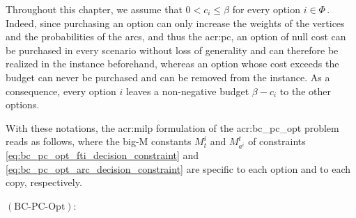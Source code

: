 \documentclass[11pt,a4paper]{report}
\makeatletter
\theoremstyle{definition}
\theoremstyle{remark}
\newcommand\xlabel[2][]{\phantomsection\def\@currentlabelname{#1}#1\label{#2}}
\newcounter{optimization_program}
\newcounter{optimization_program_st}
\newcommand{\name}[1]{\gdef\@name{#1}}%
\newcommand{\sense}[1]{\gdef\@sense{#1}}%
\newcommand{\objective}[1]{\gdef\@objective{#1}}%
\newcommand{\constraints}[1]{\gdef\@constraints{\setcounter{optimization_program_st}{1}#1\setcounter{optimization_program_st}{0}}}%
\newcommand{\constraint}[2]{\\ \ifnum\value{optimization_program_st}>0 {\textnormal{subject to~}} \else {}\fi & \text{~#1} && \text{~~~~#2} \setcounter{optimization_program_st}{0}}%
\makeatother
\begin{document}
Throughout this chapter, we assume that $0 < c_i \leq \beta$ for every option $i \in \Phi\,.$ Indeed, since purchasing an option can only increase the weights of the vertices and the probabilities of the arcs, and thus the \gls{acr:pc}, an option of null cost can be purchased in every scenario without loss of generality and can therefore be realized in the instance beforehand, whereas an option whose cost exceeds the budget can never be purchased and can be removed from the instance. As a consequence, every option $i$ leaves a non-negative budget $\beta - c_i$ to the other options.

With these notations, the \gls{acr:milp} formulation of the \gls{acr:bc_pc_opt} problem reads as follows, where the big-M constants $M^i_t$ and $M^t_{a^i}$ of constraints \eqref{eq:bc_pc_opt_fti_decision_constraint} and \eqref{eq:bc_pc_opt_arc_decision_constraint} are specific to each option and to each copy, respectively.

\vspace{0.75cm}
\xlabel[$(\text{BC-PC-Opt})$]{bc_pc_opt}:
\vspace*{-0.75cm}
\begin{optimization_program}
  \name{}
  \sense{maximize}
  \objective{$\sum\limits_{t \in V} \left(w_t \cdot f_t + \sum\limits_{i \in \Phi} w_t^i \cdot f_t^i\right)$}
  \constraints{
    \constraint{\label{eq:bc_pc_opt_flow_conservation}$\sum\limits_{a \in \delta^{\text{out}}_u} \phi^t_a - \sum\limits_{b \in \delta^{\text{in}}_u} \pi_b \cdot \phi^t_b \leq w_u + \sum\limits_{i \in \Phi} w_u^i \cdot x_i$} {$t \in V\,,$ $u \in V \setminus \{t\}$}
    \constraint{\label{eq:bc_pc_opt_flow_in_t}$\sum\limits_{a \in \delta^{\text{out}}_t} \phi^t_a - \sum\limits_{b \in \delta^{\text{in}}_t} \pi_b\cdot  \phi^t_b =  w_t + \sum\limits_{i \in \Phi} w_t^i \cdot x_i - f_t$} {$t\in V$}
    \constraint{\label{eq:bc_pc_opt_fti_ft}$f_t^i \le f_t$} {$t\in V\,,$ $i \in \Phi$}
    \constraint{\label{eq:bc_pc_opt_fti_decision_constraint}$f_t^i \le M^i_t \cdot x_i$} {$t\in V\,,$ $i \in \Phi$}
    \constraint{\label{eq:bc_pc_opt_arc_decision_constraint}$\phi^{t}_{a^i} \le M^t_{a^i} \cdot x_i$} {$t\in V\,,$ $a^i \in A'$}
    \constraint{\label{eq:bc_pc_opt_budget_constraint}$\sum\limits_{i \in \Phi} c_i \cdot x_i \le \beta$} {}
    \constraint{\label{eq:bc_pc_opt_binary_vars}$x_i\in \{0,1\}$} {$i \in \Phi$}
    \constraint{\label{eq:bc_pc_opt_flow_positive}$\phi^{t}_a\geq 0$} {$t \in V\,,$ $a \in \Psi$}
  }
\end{optimization_program}
\end{document}
